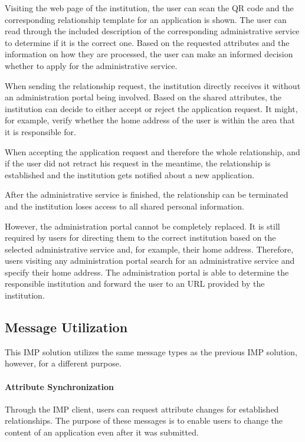Visiting the web page of the institution, the user can scan the QR code and the corresponding relationship template for an application is shown. The user can read through the included description of the corresponding administrative service to determine if it is the correct one. Based on the requested attributes and the information on how they are processed, the user can make an informed decision whether to apply for the administrative service.

When sending the relationship request, the institution directly receives it without an administration portal being involved. Based on the shared attributes, the institution can decide to either accept or reject the application request. It might, for example, verify whether the home address of the user is within the area that it is responsible for.

When accepting the application request and therefore the whole relationship, and if the user did not retract his request in the meantime, the relationship is established and the institution gets notified about a new application.

After the administrative service is finished, the relationship can be terminated and the institution loses access to all shared personal information.

However, the administration portal cannot be completely replaced. It is still required by users for directing them to the correct institution based on the selected administrative service and, for example, their home address. Therefore, users visiting any administration portal search for an administrative service and specify their home address. The administration portal is able to determine the responsible institution and forward the user to an URL provided by the institution. 

\subsection{Message Utilization}

This IMP solution utilizes the same message types as the previous IMP solution, however, for a different purpose.

\paragraph{Attribute Synchronization}

Through the IMP client, users can request attribute changes for established relationships. The purpose of these messages is to enable users to change the content of an application even after it was submitted.


